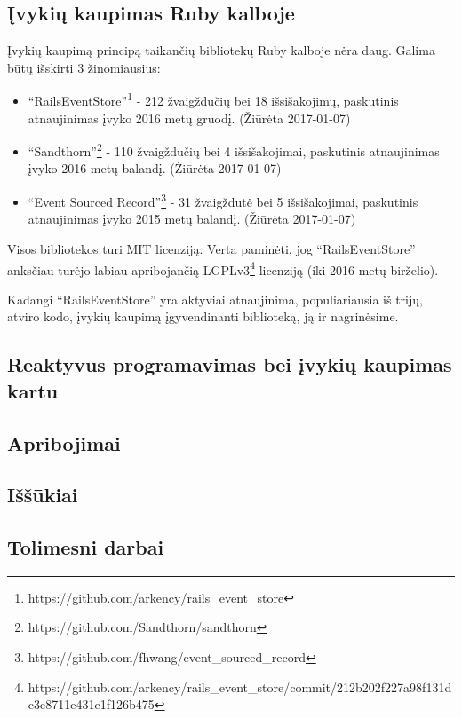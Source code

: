 \subsection{Įvykių kaupimas Ruby kalboje}

Įvykių kaupimą principą taikančių bibliotekų Ruby kalboje nėra daug. Galima būtų išskirti 3 žinomiausius:

\begin{itemize}
  \item ``RailsEventStore''\footnote{https://github.com/arkency/rails\_event\_store} - 212 žvaigždučių bei 18 išsišakojimų, paskutinis atnaujinimas įvyko 2016 metų gruodį. (Žiūrėta 2017-01-07)

  \item ``Sandthorn''\footnote{https://github.com/Sandthorn/sandthorn} - 110 žvaigždučių bei 4 išsišakojimai, paskutinis atnaujinimas įvyko 2016 metų balandį. (Žiūrėta 2017-01-07)

  \item ``Event Sourced Record''\footnote{https://github.com/fhwang/event\_sourced\_record} - 31 žvaigždutė bei 5 išsišakojimai, paskutinis atnaujinimas įvyko 2015 metų balandį. (Žiūrėta 2017-01-07)
\end{itemize}

Visos bibliotekos turi MIT licenziją. Verta paminėti, jog ``RailsEventStore'' anksčiau turėjo labiau apribojančią LGPLv3\footnote{https://github.com/arkency/rails\_event\_store/commit/212b202f227a98f131dc3e8711e431e1f126b475} licenziją (iki 2016 metų birželio).

Kadangi ``RailsEventStore'' yra aktyviai atnaujinima, populiariausia iš trijų, atviro kodo, įvykių kaupimą įgyvendinanti biblioteką, ją ir nagrinėsime.

\subsection{Reaktyvus programavimas bei įvykių kaupimas kartu}

\subsection{Apribojimai}

\subsection{Iššūkiai}

\subsection{Tolimesni darbai}
